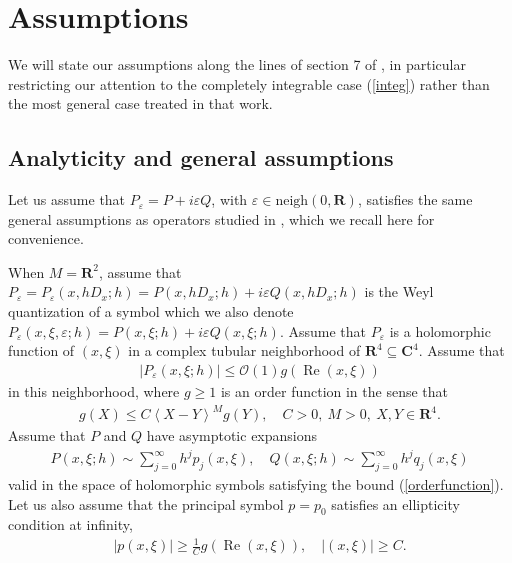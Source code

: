 \documentclass[12pt,lettersize]{article}
\DeclareMathOperator{\Real}{Re}
\renewcommand{\epsilon}{\varepsilon}
\theoremstyle{plain}%
\numberwithin{theorem}{section}
\numberwithin{equation}{section}
\theoremstyle{definition}
\theoremstyle{remark}
\begin{document}
{\section{Assumptions}\label{assumptions}
 
We will state our assumptions along the lines of section 7 of \cite{HSV}, in particular restricting our attention to the completely integrable case (\ref{integ}) rather than the most general case treated in that work. 



\subsection{Analyticity and general assumptions}


Let us assume that $P_\epsilon = P+i\epsilon Q$, with $\epsilon\in \mbox{neigh}(0,\mathbf{R})$, satisfies the same general assumptions as operators studied in \cite{HSV}, which we recall here for convenience.

When $M = \mathbf{R}^2$, assume that $P_\epsilon = P_\epsilon(x,hD_x;h) = P(x,hD_x;h) + i\epsilon Q(x,hD_x;h)$ is the Weyl quantization of a symbol which we also denote $P_\epsilon(x,\xi,\epsilon;h) = P(x,\xi;h) + i\epsilon Q(x,\xi;h)$. 
Assume that $P_\epsilon$ is a holomorphic function of $(x,\xi)$ in a complex tubular neighborhood of $\mathbf{R}^4\subseteq \mathbf{C}^4$. Assume that 
%
\begin{align}\label{orderfunction}
|P_\epsilon(x,\xi;h)| \leq \mathcal{O}(1)g(\Real(x,\xi))
\end{align}
%
in this neighborhood, where $g \geq 1$ is an order function in the sense that 
%
\begin{align*}{}
g(X) \leq C \left\langle X-Y \right\rangle^M g(Y),\quad C > 0,\ M > 0,\ X,Y\in \mathbf{R}^4. 
\end{align*}
%
Assume that $P$ and $Q$ have asymptotic expansions
%
\begin{align}
P(x,\xi;h) \sim \sum_{j=0}^\infty h^j p_j(x,\xi), \quad Q(x,\xi;h)\sim \sum_{j=0}^\infty h^j q_j(x,\xi)
\end{align}
%
valid in the space of holomorphic symbols satisfying the bound (\ref{orderfunction}). Let us also assume that the principal symbol $p = p_0$ satisfies an ellipticity condition at infinity,
%
\begin{align*}{}
|p(x,\xi)| \geq \frac{1}{C}g(\Real(x,\xi)),\quad |(x,\xi)| \geq C. 
\end{align*}

}
\end{document}
